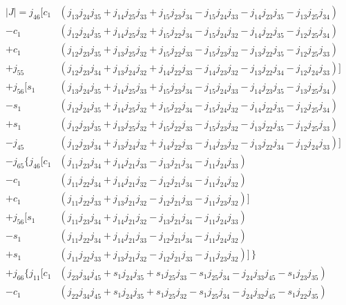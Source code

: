 \begin{align*}
    |J| =    j_{46}[c_1&(j_{13}j_{24}j_{35}+j_{14}j_{25}j_{33}+j_{15}j_{23}j_{34}-j_{15}j_{24}j_{33}-j_{14}j_{23}j_{35}-j_{13}j_{25}j_{34}) \\
                   -c_1&(j_{12}j_{24}j_{35}+j_{14}j_{25}j_{32}+j_{15}j_{22}j_{34}-j_{15}j_{24}j_{32}-j_{14}j_{22}j_{35}-j_{12}j_{25}j_{34}) \\
                   +c_1&(j_{12}j_{23}j_{35}+j_{13}j_{25}j_{32}+j_{15}j_{22}j_{33}-j_{15}j_{23}j_{32}-j_{13}j_{22}j_{35}-j_{12}j_{25}j_{33}) \\
                +j_{55}&(j_{12}j_{23}j_{34}+j_{13}j_{24}j_{32}+j_{14}j_{22}j_{33}-j_{14}j_{23}j_{32}-j_{13}j_{22}j_{34}-j_{12}j_{24}j_{33})] \\
            +j_{56}[s_1&(j_{13}j_{24}j_{35}+j_{14}j_{25}j_{33}+j_{15}j_{23}j_{34}-j_{15}j_{24}j_{33}-j_{14}j_{23}j_{35}-j_{13}j_{25}j_{34}) \\
                   -s_1&(j_{12}j_{24}j_{35}+j_{14}j_{25}j_{32}+j_{15}j_{22}j_{34}-j_{15}j_{24}j_{32}-j_{14}j_{22}j_{35}-j_{12}j_{25}j_{34}) \\
                   +s_1&(j_{12}j_{23}j_{35}+j_{13}j_{25}j_{32}+j_{15}j_{22}j_{33}-j_{15}j_{23}j_{32}-j_{13}j_{22}j_{35}-j_{12}j_{25}j_{33}) \\
                -j_{45}&(j_{12}j_{23}j_{34}+j_{13}j_{24}j_{32}+j_{14}j_{22}j_{33}-j_{14}j_{23}j_{32}-j_{13}j_{22}j_{34}-j_{12}j_{24}j_{33})] \\  
    -j_{65}\{j_{46}[c_1&(j_{11}j_{23}j_{34}+j_{14}j_{21}j_{33}-j_{13}j_{21}j_{34}-j_{11}j_{24}j_{33}) \\
                   -c_1&(j_{11}j_{22}j_{34}+j_{14}j_{21}j_{32}-j_{12}j_{21}j_{34}-j_{11}j_{24}j_{32}) \\
                   +c_1&(j_{11}j_{22}j_{33}+j_{13}j_{21}j_{32}-j_{12}j_{21}j_{33}-j_{11}j_{23}j_{32}) ] \\
            +j_{56}[s_1&(j_{11}j_{23}j_{34}+j_{14}j_{21}j_{32}-j_{13}j_{21}j_{34}-j_{11}j_{24}j_{33}) \\
                   -s_1&(j_{11}j_{22}j_{34}+j_{14}j_{21}j_{33}-j_{12}j_{21}j_{34}-j_{11}j_{24}j_{32}) \\
                   +s_1&(j_{11}j_{22}j_{33}+j_{13}j_{21}j_{32}-j_{12}j_{21}j_{33}-j_{11}j_{23}j_{32})] \, \} \\   
    +j_{66}\{j_{11}[c_1&(j_{23}j_{34}j_{45}+s_1j_{24}j_{35}+s_1j_{25}j_{33}-s_1j_{25}j_{34}-j_{24}j_{33}j_{45}-s_1j_{23}j_{35}) \\
                   -c_1&(j_{22}j_{34}j_{45}+s_1j_{24}j_{35}+s_1j_{25}j_{32}-s_1j_{25}j_{34}-j_{24}j_{32}j_{45}-s_1j_{22}j_{35}) \\

\end{align*}
